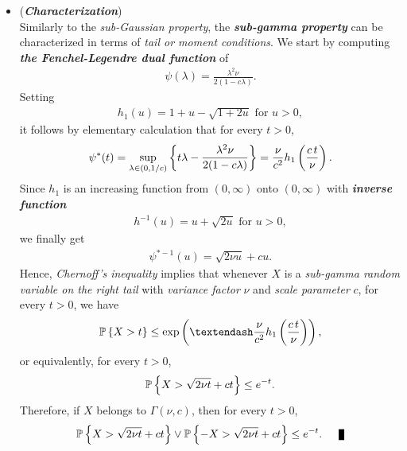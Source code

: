 \documentclass[11pt]{article}
\begin{document}
\begin{itemize}
\item \begin{remark} (\textbf{\emph{Characterization}})\\
Similarly to the \emph{sub-Gaussian property}, the \emph{\textbf{sub-gamma property}} can be characterized in terms of \emph{tail or moment conditions}. We start by computing \emph{\textbf{the Fenchel-Legendre dual function}} of
\begin{align*}
\psi(\lambda) = \frac{\lambda^2 \nu}{2(1 - c\lambda)}.
\end{align*}
Setting
\begin{align*}
h_1(u) = 1 + u - \sqrt{1 + 2u}\text{ for }u > 0,
\end{align*}
it follows by elementary calculation that for every $t > 0$,
\begin{align*}
\psi^{*}(t)  = \sup_{\lambda \in (0, 1/c)}\left\{t\lambda - \frac{\lambda^2 \nu}{2(1 - c\lambda)}\right\} = \frac{\nu}{c^2}h_1\left(\frac{c\,t}{\nu}\right).
\end{align*}
Since $h_1$ is an increasing function from $(0, \infty)$ onto $(0, \infty)$ with \textbf{\emph{inverse function}}
\begin{align*}
h^{-1}(u) = u + \sqrt{2u}\text{ for }u > 0,
\end{align*} we finally get
\begin{align*}
\psi^{*-1}(u) = \sqrt{2\nu u} + c u.
\end{align*}
Hence, \emph{Chernoff's inequality} implies that whenever $X$ is a \emph{sub-gamma random variable on the right tail} with \emph{variance factor} $\nu$ and \textit{scale parameter} $c$, for every $t > 0$, we have
\begin{align}
\bP\set{X > t} \le \exp\paren{– \frac{\nu}{c^2}h_1\paren{\frac{c\,t}{\nu}}}, \label{ineqn: tail_sub_gamma}
\end{align}
or equivalently, for every $t > 0$,
\begin{align}
{\mathbb P}\left\{X > \sqrt{2\nu t}+ c t\right\} \le e^{-t}.
\end{align} Therefore, if $X$ belongs to $\Gamma(\nu, c)$, then for every $t > 0$,
\begin{align*}
\bP\set{X > \sqrt{2\nu t}+ c t} \lor \bP\set{-X > \sqrt{2\nu t}+ c t}  \le e^{-t}. \qed
\end{align*}
\end{remark}
\end{itemize}
\end{document}
